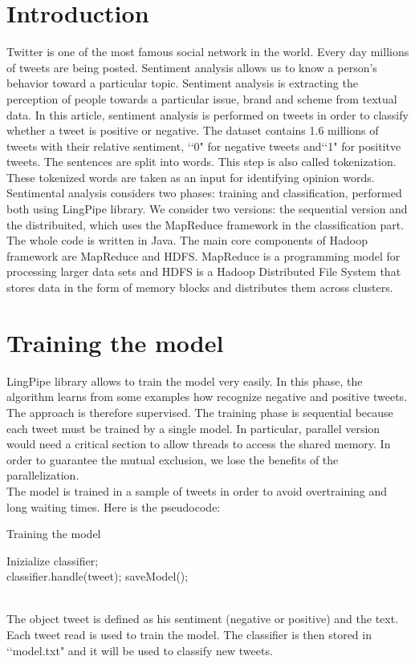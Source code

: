 \documentclass[10pt,twocolumn,letterpaper]{article}
\begin{document}
\section{Introduction}
Twitter is one of the most famous social network in the world. Every day millions of tweets are being posted. Sentiment analysis allows us to know a person’s behavior toward a particular topic.
Sentiment analysis is extracting the perception of people towards a particular issue, brand and scheme from textual data.
In this article, sentiment analysis is performed on tweets in order to classify whether a tweet is positive or negative. The dataset contains 1.6 millions of tweets with their relative sentiment, \lq \lq 0" for negative tweets and\lq \lq1" for posititve tweets. The sentences are split into words. This step is also called tokenization. These tokenized words are taken as an input for identifying opinion words.\\
Sentimental analysis considers two phases: training and classification, performed both using LingPipe library. We consider two versions: the sequential version and the distribuited, which uses the MapReduce framework in the classification part. The whole code is written in Java.
The main core components of Hadoop framework are MapReduce and HDFS. MapReduce is a programming model for processing larger data sets and HDFS is a Hadoop Distributed File System that stores data in the form of memory blocks and distributes them across clusters.


\section{Training the model}
LingPipe library allows to train the model very easily. In this phase, the algorithm learns from some examples how recognize negative and positive tweets. The approach is therefore supervised. The training phase is sequential because each tweet must be trained by a single model. In particular, parallel version would need a critical section to allow threads to access the shared memory. In order to guarantee the mutual exclusion, we lose the benefits of the parallelization.
\\The model is trained in a sample of tweets in order to avoid overtraining and long waiting times. Here is the pseudocode:\\
\begin{algorithm}
\label{Training the model}
\caption{Training the model}
\begin{algorithmic}
	\State Inizialize classifier;
    		 \do \\
			\State classifier.handle(tweet);
		\EndFor
    		\State saveModel();   	
\end{algorithmic}
\end{algorithm} 
\\
The object tweet is defined as his sentiment (negative or positive) and the text. Each tweet read is used to train the model. The classifier is then stored in \lq\lq model.txt" and it will be used to classify new tweets.
\end{document}
